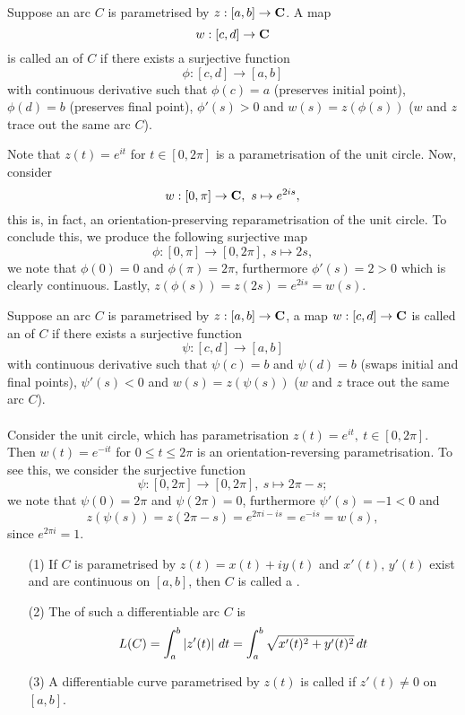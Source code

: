 \medskip

\begin{definition}
Suppose an arc $C$ is parametrised by $z:[a,b] \to \mathbf C$. A map
\[w:[c,d] \to \mathbf C\]
is called an  of $C$ if there exists a surjective function
\[\phi:[c,d] \to [a,b]\]
with continuous derivative such that $\phi(c) = a$ (preserves initial point), $\phi(d) = b$ (preserves final point), $\phi'(s) > 0$ and $w(s) = z(\phi(s))$ ($w$ and $z$ trace out the same arc $C$).
\end{definition}

\medskip

\begin{example}
Note that $z(t) = e^{it}$ for $t \in [0,2\pi]$ is a parametrisation of the unit circle. Now, consider
\[w:[0,\pi] \to \mathbf C,\ s \mapsto e^{2is},\]
this is, in fact, an orientation-preserving reparametrisation of the unit circle. To conclude this, we produce the following surjective map
\[\phi:[0,\pi] \to [0,2\pi],\ s \mapsto 2s,\]
we note that $\phi(0) = 0$ and $\phi(\pi) = 2\pi$, furthermore $\phi'(s) = 2 > 0$ which is clearly continuous. Lastly, $z(\phi(s)) = z(2s) = e^{2is} = w(s)$.
\end{example}

\medskip

\begin{remark}
Suppose an arc $C$ is parametrised by $z:[a,b] \to \mathbf C$, a map $w:[c,d] \to \mathbf C$ 
is called an  of $C$ if there exists a surjective function
\[\psi:[c,d] \to [a,b]\]
with continuous derivative such that $\psi(c) = b$ and $\psi(d) = b$ (swaps initial and final points), $\psi'(s) < 0$ and $w(s) = z(\psi(s))$ ($w$ and $z$ trace out the same arc $C$).\\
\\
Consider the unit circle, which has parametrisation $z(t) = e^{it},\ t \in [0,2\pi]$. Then $w(t) = e^{-it}$ for $0 \leq t \leq 2\pi$ is an orientation-reversing parametrisation. To see this, we consider the surjective function
\[\psi:[0,2\pi] \to [0,2\pi],\ s \mapsto 2\pi - s;\]
we note that $\psi(0) = 2\pi$ and $\psi(2\pi) = 0$, furthermore $\psi'(s) = -1 < 0$ and \[z(\psi(s)) = z(2\pi - s) = e^{2\pi i - is} = e^{-is} = w(s),\] since $e^{2\pi i} = 1$.
\end{remark}

\medskip

\begin{definition}\hfill
\begin{itemize}
\item[(1)] If $C$ is parametrised by $z(t) = x(t) + iy(t)$ and $x'(t),\,y'(t)$ exist and are continuous on $[a,b]$, then $C$ is called a .
\item[(2)] The  of such a differentiable arc $C$ is
\[L(C) = \int_a^b \left\lvert z'(t)\right\rvert\,dt = \int_a^b\sqrt{x'(t)^2 + y'(t)^2}\,dt\]
\item[(3)] A differentiable curve parametrised by $z(t)$ is called  if $z'(t) \neq 0$ on $[a,b]$.
\end{itemize}
\end{definition}

